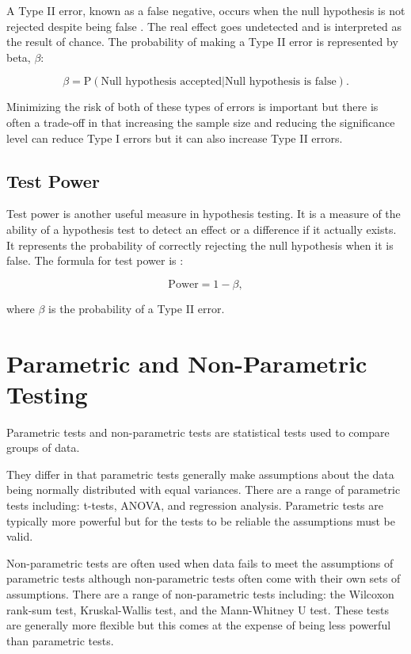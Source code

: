 \documentclass[
]{book}
\begin{document}
A Type II error, known as a false negative, occurs when the null hypothesis is not rejected despite being false \citep{banerjee}. The real effect goes undetected and is interpreted as the result of chance. The probability of making a Type II error is represented by beta, \(\beta\):

\[\beta= \textrm{P} (\textrm{Null hypothesis accepted} | \textrm{Null hypothesis is false}).\]

Minimizing the risk of both of these types of errors is important but there is often a trade-off in that increasing the sample size and reducing the significance level can reduce Type I errors but it can also increase Type II errors.

\hypertarget{test-power}{%
\subsection{Test Power}\label{test-power}}

Test power is another useful measure in hypothesis testing. It is a measure of the ability of a hypothesis test to detect an effect or a difference if it actually exists. It represents the probability of correctly rejecting the null hypothesis when it is false. The formula for test power is \citep{swinscow}:

\[\textrm{Power}= 1-\beta,\]

where \(\beta\) is the probability of a Type II error.

\hypertarget{nonpara}{%
\section{Parametric and Non-Parametric Testing}\label{nonpara}}

Parametric tests and non-parametric tests are statistical tests used to compare groups of data.

They differ in that parametric tests generally make assumptions about the data being normally distributed with equal variances. There are a range of parametric tests including: t-tests, ANOVA, and regression analysis. Parametric tests are typically more powerful but for the tests to be reliable the assumptions must be valid.

Non-parametric tests are often used when data fails to meet the assumptions of parametric tests although non-parametric tests often come with their own sets of assumptions. There are a range of non-parametric tests including: the Wilcoxon rank-sum test, Kruskal-Wallis test, and the Mann-Whitney U test. These tests are generally more flexible but this comes at the expense of being less powerful than parametric tests.
\end{document}
